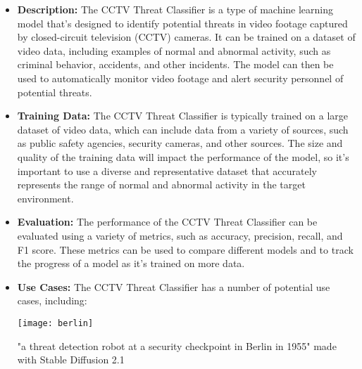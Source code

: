 \begin{itemize}
    \item \textbf{Description:} The CCTV Threat Classifier is a type of machine learning model that's designed to identify potential threats in video footage captured by closed-circuit television (CCTV) cameras. It can be trained on a dataset of video data, including examples of normal and abnormal activity, such as criminal behavior, accidents, and other incidents. The model can then be used to automatically monitor video footage and alert security personnel of potential threats.
    \item \textbf{Training Data:} The CCTV Threat Classifier is typically trained on a large dataset of video data, which can include data from a variety of sources, such as public safety agencies, security cameras, and other sources. The size and quality of the training data will impact the performance of the model, so it's important to use a diverse and representative dataset that accurately represents the range of normal and abnormal activity in the target environment.
    \item \textbf{Evaluation:} The performance of the CCTV Threat Classifier can be evaluated using a variety of metrics, such as accuracy, precision, recall, and F1 score. These metrics can be used to compare different models and to track the progress of a model as it's trained on more data.
    \item \textbf{Use Cases:} The CCTV Threat Classifier has a number of potential use cases, including:
        
\begin{pdf}
\begin{marginfigure}[-5.5cm]
        \texttt{[image: berlin]}
        \caption{"a threat detection robot at a security checkpoint in Berlin in 1955" made with Stable Diffusion 2.1}
\end{marginfigure}
\end{pdf}


\end{itemize}
